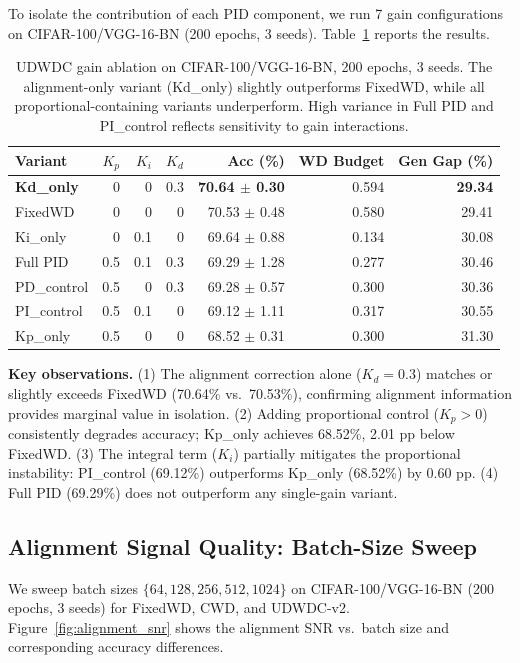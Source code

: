 \documentclass{article}
\begin{document}
To isolate the contribution of each PID component, we run 7 gain configurations on CIFAR-100/VGG-16-BN (200 epochs, 3 seeds). Table~\ref{tab:ablation} reports the results.

\begin{table}[t]
\centering
\caption{UDWDC gain ablation on CIFAR-100/VGG-16-BN, 200 epochs, 3 seeds. The alignment-only variant (Kd\_only) slightly outperforms FixedWD, while all proportional-containing variants underperform. High variance in Full PID and PI\_control reflects sensitivity to gain interactions.}
\label{tab:ablation}
\begin{tabular}{lrrrrrr}
\toprule
Variant & $K_p$ & $K_i$ & $K_d$ & Acc (\%) & WD Budget & Gen Gap (\%) \\
\midrule
\textbf{Kd\_only} & 0 & 0 & 0.3 & \textbf{70.64 $\pm$ 0.30} & 0.594 & \textbf{29.34} \\
FixedWD & 0 & 0 & 0 & 70.53 $\pm$ 0.48 & 0.580 & 29.41 \\
Ki\_only & 0 & 0.1 & 0 & 69.64 $\pm$ 0.88 & 0.134 & 30.08 \\
Full PID & 0.5 & 0.1 & 0.3 & 69.29 $\pm$ 1.28 & 0.277 & 30.46 \\
PD\_control & 0.5 & 0 & 0.3 & 69.28 $\pm$ 0.57 & 0.300 & 30.36 \\
PI\_control & 0.5 & 0.1 & 0 & 69.12 $\pm$ 1.11 & 0.317 & 30.55 \\
Kp\_only & 0.5 & 0 & 0 & 68.52 $\pm$ 0.31 & 0.300 & 31.30 \\
\bottomrule
\end{tabular}
\end{table}

\textbf{Key observations.} (1) The alignment correction alone ($K_d = 0.3$) matches or slightly exceeds FixedWD (70.64\% vs.~70.53\%), confirming alignment information provides marginal value in isolation. (2) Adding proportional control ($K_p > 0$) consistently degrades accuracy; Kp\_only achieves 68.52\%, 2.01 pp below FixedWD. (3) The integral term ($K_i$) partially mitigates the proportional instability: PI\_control (69.12\%) outperforms Kp\_only (68.52\%) by 0.60 pp. (4) Full PID (69.29\%) does not outperform any single-gain variant.

\subsection{Alignment Signal Quality: Batch-Size Sweep}
\label{sec:batchsize}

We sweep batch sizes $\{64, 128, 256, 512, 1024\}$ on CIFAR-100/VGG-16-BN (200 epochs, 3 seeds) for FixedWD, CWD, and UDWDC-v2. Figure~\ref{fig:alignment_snr} shows the alignment SNR vs.~batch size and corresponding accuracy differences.
\end{document}
